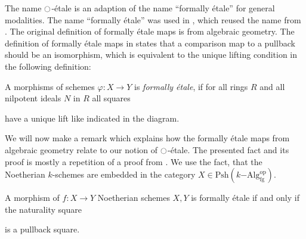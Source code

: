 \documentclass[9pt,twosided]{amsart}
\begin{document}
The name ${\ocircle}$-étale is an adaption of the name ``formally étale'' for general modalities.
The name ``formally étale'' was used in \cite{wellen-thesis}, which reused the name from \cite{SyntheticPDEs}.
The original definition of formally étale maps is from algebraic geometry.
The definition of formally étale maps in \cite[§ 17]{GrothendieckDieudonne} states that a comparison map to a pullback should be an isomorphism,
which is equivalent to the unique lifting condition in the following definition:
\begin{defn}
  A morphisms of schemes $\varphi:X\to Y$ is \emph{formally étale},
  if for all rings $R$ and all nilpotent ideals $N$ in $R$ all squares
  \begin{center}
  \end{center}
  have a unique lift like indicated in the diagram.
\end{defn}
We will now make a remark which explains how the formally étale maps from algebraic geometry relate to our notion of ${\ocircle}$-étale.
The presented fact and its proof is mostly a repetition of a proof from \cite[Section 4.4]{wellen-thesis}.
We use the fact, that the Noetherian $k$-schemes are embedded in the category $X\in\mathrm{Psh}(k\mathrm{-Alg}^\mathrm{op}_{\mathrm{fg}})$.
\begin{rmk}
  A morphism of $f:X\to Y$ Noetherian schemes $X,Y$ is formally étale if and only if the naturality square
  \begin{center}
  \end{center}
  is a pullback square.
\end{rmk}
\end{document}

